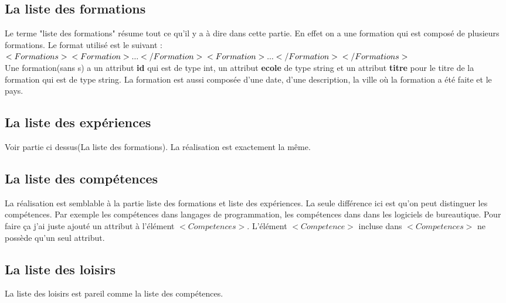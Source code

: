 \documentclass[12pt,a4paper]{article}
\begin{document}
	\subsection{La liste des formations}
	Le terme "liste des formations" résume tout ce qu'il y a à dire dans cette partie. En effet on a une formation qui est composé de
	plusieurs formations. Le format utilisé est le suivant : \\
	$
	<Formations>\\
		<Formation>...</Formation>\\
		<Formation>...</Formation>\\
	</Formations>
	$\\
	Une formation(sans s) a un attribut \textbf{id} qui est de type int, un attribut \textbf{ecole} de type string et un attribut
	\textbf{titre} pour le titre de la formation qui est de type string. La formation est aussi composée d'une date, d'une description,
	la ville où la formation a été faite et le pays.
	
	\subsection{La liste des expériences}	
	Voir partie ci dessus(La liste des formations). La réalisation est exactement la même.
	
	\subsection{La liste des compétences}
	La réalisation est semblable à la partie liste des formations et liste des expériences. La seule différence ici est qu'on peut 
	distinguer les compétences. Par exemple les compétences dans langages de programmation, les compétences dans dans les logiciels de
	bureautique. Pour faire ça j'ai juste ajouté un attribut à l'élément $ <Competences> $. L'élément $ <Competence> $ incluse dans 
	$ <Competences> $ ne possède qu'un seul attribut.
	
	\subsection{La liste des loisirs}
	La liste des loisirs est pareil comme la liste des compétences.
\end{document}
